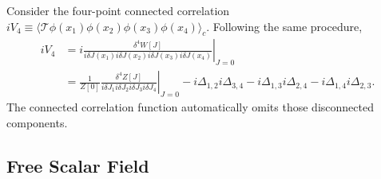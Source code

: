 \documentclass[aps,prb,superscriptaddress,nofootinbib]{revtex4}
\begin{document}
Consider the four-point connected correlation $iV_4 \equiv \langle \mathcal{T}\phi(x_1) \phi(x_2) \phi(x_3) \phi(x_4)\rangle_c$.
Following the same procedure,
\begin{equation}
\begin{aligned}
	iV_4 
	&= i\left.\frac{\delta^4 W[J]}{i\delta J(x_1)i\delta J(x_2)i\delta J(x_3)i\delta J(x_4)}\right|_{J=0} \\
	&= \frac{1}{Z[0]}\left.\frac{\delta^4 Z[J]}{i\delta J_1 i\delta J_2 i\delta J_3 i\delta J_4}\right|_{J=0} 
	-i\Delta_{1,2} i\Delta_{3,4} -i\Delta_{1,3} i\Delta_{2,4} -i\Delta_{1,4} i\Delta_{2,3}.
\end{aligned}
\end{equation}
The connected correlation function automatically omits those disconnected components.

\subsection{Free Scalar Field}
\end{document}
